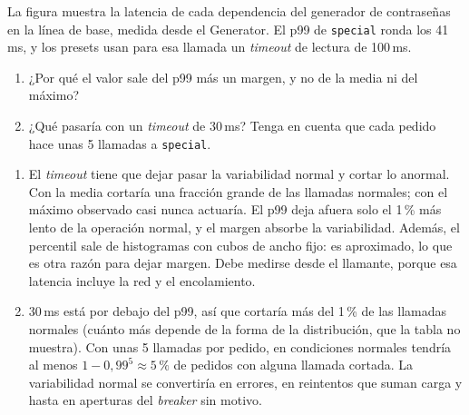 \documentclass[variant=guia,cover=institutional,mode=screen]{ua-engineering-v6-article}
\begin{document}
\begin{uaexercise}
La figura muestra la latencia de cada dependencia del generador de contraseñas en la línea de base, medida desde el Generator. El p99 de \texttt{special} ronda los 41\,ms, y los presets usan para esa llamada un \emph{timeout} de lectura de 100\,ms.
\begin{enumerate}
\item ¿Por qué el valor sale del p99 más un margen, y no de la media ni del máximo?
\item ¿Qué pasaría con un \emph{timeout} de 30\,ms? Tenga en cuenta que cada pedido hace unas 5 llamadas a \texttt{special}.
\end{enumerate}
\end{uaexercise}
\begin{uaanswer}
\begin{enumerate}
\item El \emph{timeout} tiene que dejar pasar la variabilidad normal y cortar lo anormal. Con la media cortaría una fracción grande de las llamadas normales; con el máximo observado casi nunca actuaría. El p99 deja afuera solo el 1\,\% más lento de la operación normal, y el margen absorbe la variabilidad. Además, el percentil sale de histogramas con cubos de ancho fijo: es aproximado, lo que es otra razón para dejar margen. Debe medirse desde el llamante, porque esa latencia incluye la red y el encolamiento.
\item 30\,ms está por debajo del p99, así que cortaría más del 1\,\% de las llamadas normales (cuánto más depende de la forma de la distribución, que la tabla no muestra). Con unas 5 llamadas por pedido, en condiciones normales tendría al menos $1 - 0{,}99^5 \approx 5\,\%$ de pedidos con alguna llamada cortada. La variabilidad normal se convertiría en errores, en reintentos que suman carga y hasta en aperturas del \emph{breaker} sin motivo.
\end{enumerate}
\end{uaanswer}
\end{document}
